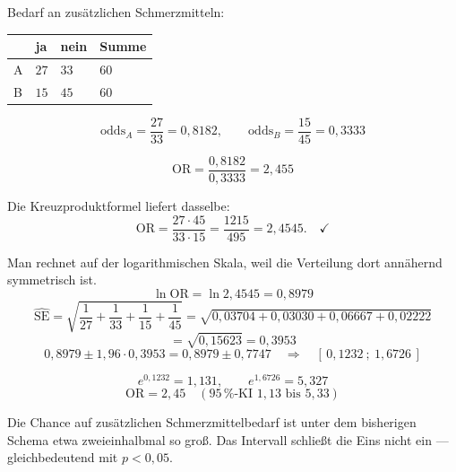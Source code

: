 \begin{merksatz}
Bedarf an zusätzlichen Schmerzmitteln:
\begin{center}
\renewcommand{\arraystretch}{1.48}
\begin{tabular}{@{}P{1.8cm}P{1.6cm}P{1.6cm}P{1.6cm}@{}}
\toprule
& \textbf{ja} & \textbf{nein} & \textbf{Summe}\\
\midrule
A & $27$ & $33$ & $60$\\
B & $15$ & $45$ & $60$\\
\bottomrule
\end{tabular}
\end{center}

\[ \mathrm{odds}_A = \frac{27}{33} = 0{,}8182, \qquad \mathrm{odds}_B = \frac{15}{45} = 0{,}3333 \]

\[ \mathrm{OR} = \frac{0{,}8182}{0{,}3333} = 2{,}455 \]

Die Kreuzproduktformel liefert dasselbe:
\[ \mathrm{OR} = \frac{27 \cdot 45}{33 \cdot 15} = \frac{1215}{495} = 2{,}4545 . \quad \checkmark \]

Man rechnet auf der logarithmischen Skala, weil die Verteilung dort annähernd symmetrisch ist.
\[ \ln \mathrm{OR} = \ln 2{,}4545 = 0{,}8979 \]
\[ \widehat{\mathrm{SE}} = \sqrt{\frac{1}{27}+\frac{1}{33}+\frac{1}{15}+\frac{1}{45}} = \sqrt{0{,}03704+0{,}03030+0{,}06667+0{,}02222} \]
\[ = \sqrt{0{,}15623} = 0{,}3953 \]
\[ 0{,}8979 \pm 1{,}96 \cdot 0{,}3953 = 0{,}8979 \pm 0{,}7747 \quad\Longrightarrow\quad [\,0{,}1232\ ;\ 1{,}6726\,] \]

\[ e^{0{,}1232} = 1{,}131, \qquad e^{1{,}6726} = 5{,}327 \]
\[ \mathrm{OR} = 2{,}45 \quad (95\,\%\text{-KI } 1{,}13 \text{ bis } 5{,}33) \]

Die Chance auf zusätzlichen Schmerzmittelbedarf ist unter dem bisherigen Schema etwa zweieinhalbmal so groß. Das Intervall schließt die Eins nicht ein --- gleichbedeutend mit $p < 0{,}05$.

\begin{center}
\begin{minipage}{0.88\textwidth}
\end{minipage}
\end{center}
\end{merksatz}

